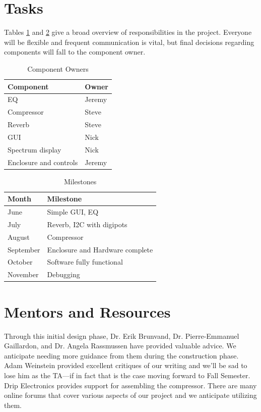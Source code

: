 \documentclass[journal]{IEEEtran}
\begin{document}
	\section{Tasks}
	
	Tables \ref{tab:owners} and \ref{tab:milestones} give a broad overview of responsibilities in the project. Everyone will be flexible and frequent communication is vital, but final decisions regarding components will fall to the component owner.
	
	\begin{table}[H]
		\centering
		\caption{Component Owners}
		\label{tab:owners}
		\begin{tabular}{l|l}
			Component                     & Owner \\ \hline
			EQ                     & Jeremy \\
			Compressor             & Steve  \\
			Reverb                 & Steve  \\
			GUI                    & Nick   \\
			Spectrum display       & Nick   \\
			Enclosure and controls & Jeremy
		\end{tabular}
	\end{table}

	\begin{table}[H]
		\centering
		\caption{Milestones}
		\label{tab:milestones}
		\begin{tabular}{l|l}
			Month     & Milestone                       \\ \hline
			June      & Simple GUI, EQ                  \\
			July      & Reverb, I2C with digipots       \\
			August    & Compressor                      \\
			September & Enclosure and Hardware complete \\
			October   & Software fully functional       \\
			November  & Debugging                      
		\end{tabular}
	\end{table}
	
	\section{Mentors and Resources}
	Through this initial design phase, Dr. Erik Brunvand, Dr. Pierre-Emmanuel Gaillardon, and Dr. Angela Rassmussen have provided valuable advice. We anticipate needing more guidance from them during the construction phase. Adam Weinstein provided excellent critiques of our writing and we'll be sad to lose him as the TA---if in fact that is the case moving forward to Fall Semester. Drip Electronics provides support for assembling the compressor. There are many online forums that cover various aspects of our project and we anticipate utilizing them.
	
\end{document}
